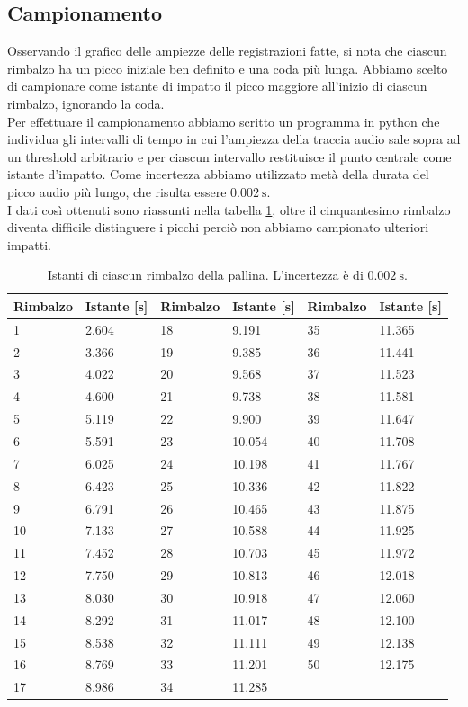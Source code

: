 \documentclass[a4paper]{article}
\begin{document}
    \subsection{Campionamento}
    Osservando il grafico delle ampiezze delle registrazioni fatte, si nota che ciascun rimbalzo
    ha un picco iniziale ben definito e una coda più lunga. 
    Abbiamo scelto di campionare come istante di impatto il picco maggiore all'inizio di ciascun rimbalzo,
    ignorando la coda.\\
    Per effettuare il campionamento abbiamo scritto un programma in python che individua
    gli intervalli di tempo in cui l'ampiezza della traccia audio sale sopra ad un threshold
    arbitrario e per ciascun intervallo restituisce il punto centrale come istante d'impatto.
    Come incertezza abbiamo utilizzato metà della durata del picco audio più lungo,
    che risulta essere $\SI{0.002}{\second}$.\\
    I dati così ottenuti sono riassunti nella tabella \ref{tab:rimbalzi}, oltre il
    cinquantesimo rimbalzo diventa difficile distinguere i picchi perciò
    non abbiamo campionato ulteriori impatti.
    \begin{table}[ht!]
        \centering
        \begin{tabular}{ll|ll|ll}
            Rimbalzo & Istante [\si{s}] & Rimbalzo & Istante [\si{s}] & Rimbalzo & Istante [\si{s}]\\
            \hline
            \hline
            1&2.604&18&9.191&35&11.365\\
            2&3.366&19&9.385&36&11.441\\
            3&4.022&20&9.568&37&11.523\\
            4&4.600&21&9.738&38&11.581\\
            5&5.119&22&9.900&39&11.647\\
            6&5.591&23&10.054&40&11.708\\
            7&6.025&24&10.198&41&11.767\\
            8&6.423&25&10.336&42&11.822\\
            9&6.791&26&10.465&43&11.875\\
            10&7.133&27&10.588&44&11.925\\
            11&7.452&28&10.703&45&11.972\\
            12&7.750&29&10.813&46&12.018\\
            13&8.030&30&10.918&47&12.060\\
            14&8.292&31&11.017&48&12.100\\
            15&8.538&32&11.111&49&12.138\\
            16&8.769&33&11.201&50&12.175\\
            17&8.986&34&11.285&
        \end{tabular}
        \caption{Istanti di ciascun rimbalzo della pallina. L'incertezza è di $\SI{0.002}{\second}$.}
        \label{tab:rimbalzi}
    \end{table}
\end{document}
